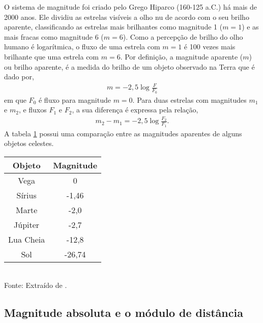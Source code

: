 O sistema de magnitude foi criado pelo Grego Hiparco (160-125 a.C.) há mais de 2000 anos. Ele dividiu as estrelas visíveis a olho nu de acordo com o seu brilho aparente, classificando as estrelas mais brilhantes como magnitude 1 ($m=1$) e as mais fracas como magnitude 6 ($m=6$). Como a percepção de brilho do olho humano é logarítmica, o fluxo de uma estrela com
$m=1$ é 100 vezes mais brilhante que uma estrela com $m=6$. Por definição, a magnitude aparente ($m$) ou brilho aparente, é a medida do brilho de um objeto observado na Terra que é dado por,
\begin{align}
m = - 2,5 \log \frac{F}{F_0}
\end{align}
em que $F_0$ é fluxo para magnitude $m=0$. Para duas estrelas com magnitudes $m_1$ e $m_2$, e fluxos $F_1$ e $F_2$, a sua diferença é expressa pela relação,
\begin{align}
m_2 - m_1 = -2,5 \log \frac{F_2}{F_1}.
\end{align}
A tabela \ref{tab:magnitudes} possui uma comparação entre as magnitudes aparentes de alguns objetos celestes.

\begin{table}[ht]
\begin{center}
\begin{tabular}{c|c}
\toprule%
Objeto & Magnitude \\
\midrule%
Vega & 0 \\
Sírius & -1,46 \\
Marte & -2,0 \\
Júpiter & -2,7 \\
Lua Cheia & -12,8 \\
Sol & -26,74 \\
\bottomrule%
\end{tabular} \\
\small
\vspace{2mm}Fonte: Extraído de \citet{keplerLivro2013}.
\label{tab:magnitudes}
\end{center}
\end{table}

\subsection{Magnitude absoluta e o módulo de distância}

